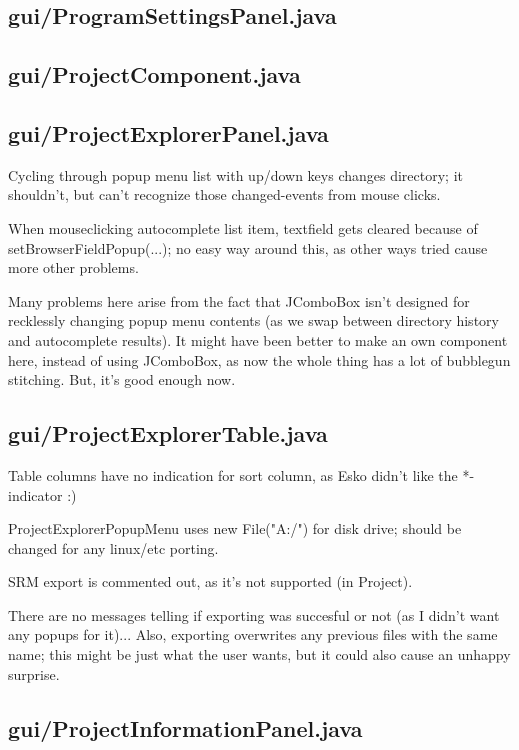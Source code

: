 \subsection{gui/ProgramSettingsPanel.java}

\subsection{gui/ProjectComponent.java}

\subsection{gui/ProjectExplorerPanel.java}

Cycling through popup menu list with up/down keys changes directory; it shouldn't, but can't recognize those changed-events from mouse clicks.

When mouseclicking autocomplete list item, textfield gets cleared because of setBrowserFieldPopup(...); no easy way around this, as other ways tried cause more other problems.

Many problems here arise from the fact that JComboBox isn't designed for recklessly changing popup menu contents (as we swap between directory history and autocomplete results). It might have been better to make an own component here, instead of using JComboBox, as now the whole thing has a lot of bubblegun stitching. But, it's good enough now.


\subsection{gui/ProjectExplorerTable.java}

Table columns have no indication for sort column, as Esko didn't like the *-indicator :)
	    
ProjectExplorerPopupMenu uses new File("A:/") for disk drive; should be changed for any linux/etc porting.

SRM export is commented out, as it's not supported (in Project).

There are no messages telling if exporting was succesful or not (as I didn't want any popups for it)... Also, exporting overwrites any previous files with the same name; this might be just what the user wants, but it could also cause an unhappy surprise.


\subsection{gui/ProjectInformationPanel.java}


